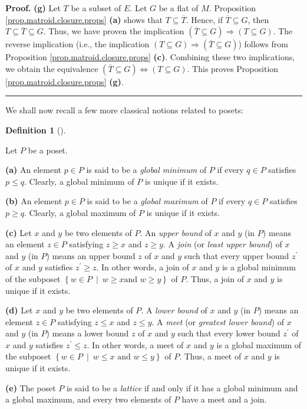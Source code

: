 \documentclass[numbers=enddot,12pt,final,onecolumn,notitlepage]{scrartcl}%
\theoremstyle{definition}
\newtheorem{defi}[theo]{Definition}
\newenvironment{definition}[1][]
{\begin{defi}[#1]\begin{leftbar}}
{\end{leftbar}\end{defi}}
\newenvironment{proof}[1][Proof]{\noindent\textbf{#1.} }{\ \rule{0.5em}{0.5em}}
\begin{document}
\begin{proof}
\textbf{(g)} Let $T$ be a subset of $E$. Let $G$ be a flat of $M$. Proposition
\ref{prop.matroid.closure.props} \textbf{(a)} shows that $T\subseteq
\overline{T}$. Hence, if $\overline{T}\subseteq G$, then $T\subseteq
\overline{T}\subseteq G$. Thus, we have proven the implication $\left(
\overline{T}\subseteq G\right)  \Longrightarrow\left(  T\subseteq G\right)  $.
The reverse implication (i.e., the implication $\left(  T\subseteq G\right)
\Longrightarrow\left(  \overline{T}\subseteq G\right)  $) follows from
Proposition \ref{prop.matroid.closure.props} \textbf{(c)}. Combining these two
implications, we obtain the equivalence $\left(  \overline{T}\subseteq
G\right)  \Longleftrightarrow\left(  T\subseteq G\right)  $. This proves
Proposition \ref{prop.matroid.closure.props} \textbf{(g)}.
\end{proof}

We shall now recall a few more classical notions related to posets:

\begin{definition}
\label{def.lattice}Let $P$ be a poset.

\textbf{(a)} An element $p\in P$ is said to be a \emph{global minimum} of $P$
if every $q\in P$ satisfies $p\leq q$. Clearly, a global minimum of $P$ is
unique if it exists.

\textbf{(b)} An element $p\in P$ is said to be a \emph{global maximum} of $P$
if every $q\in P$ satisfies $p\geq q$. Clearly, a global maximum of $P$ is
unique if it exists.

\textbf{(c)} Let $x$ and $y$ be two elements of $P$. An \emph{upper bound} of
$x$ and $y$ (in $P$) means an element $z\in P$ satisfying $z\geq x$ and $z\geq
y$. A \emph{join} (or \emph{least upper bound}) of $x$ and $y$ (in $P$) means
an upper bound $z$ of $x$ and $y$ such that every upper bound $z^{\prime}$ of
$x$ and $y$ satisfies $z^{\prime}\geq z$. In other words, a join of $x$ and
$y$ is a global minimum of the subposet $\left\{  w\in P\ \mid\ w\geq x\text{
and }w\geq y\right\}  $ of $P$. Thus, a join of $x$ and $y$ is unique if it exists.

\textbf{(d)} Let $x$ and $y$ be two elements of $P$. A \emph{lower bound} of
$x$ and $y$ (in $P$) means an element $z\in P$ satisfying $z\leq x$ and $z\leq
y$. A \emph{meet} (or \emph{greatest lower bound}) of $x$ and $y$ (in $P$)
means a lower bound $z$ of $x$ and $y$ such that every lower bound $z^{\prime
}$ of $x$ and $y$ satisfies $z^{\prime}\leq z$. In other words, a meet of $x$
and $y$ is a global maximum of the subposet $\left\{  w\in P\ \mid\ w\leq
x\text{ and }w\leq y\right\}  $ of $P$. Thus, a meet of $x$ and $y$ is unique
if it exists.

\textbf{(e)} The poset $P$ is said to be a \emph{lattice} if and only if it
has a global minimum and a global maximum, and every two elements of $P$ have
a meet and a join.
\end{definition}
\end{document}
